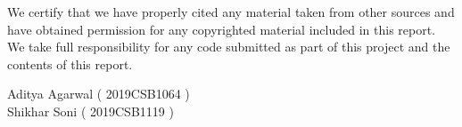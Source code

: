 


\begin{honorcode}      %

We certify that we have properly cited any material taken from other sources and have obtained permission for any
copyrighted material included in this report. We take full responsibility for any code submitted as part of this 
project and the contents of this report. \\

\vspace*{20mm}

\begin{flushright}
Aditya Agarwal ( 2019CSB1064 ) \\ \vspace*{20mm} Shikhar Soni ( 2019CSB1119 ) \\ 
\end{flushright}

\end{honorcode}




